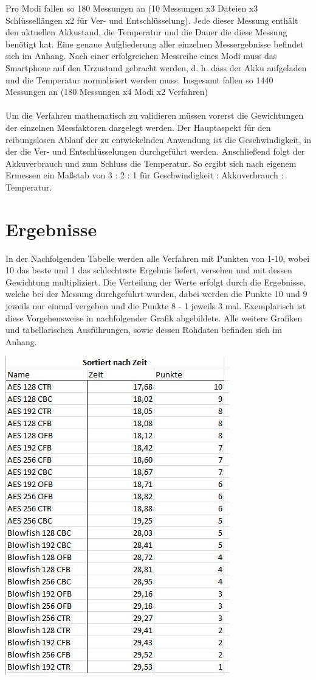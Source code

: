 \documentclass[10pt, a4paper,headsepline]{scrreprt}
\begin{document}
Pro Modi fallen so 180 Messungen an (10 Messungen x3 Dateien x3 Schlüssellängen x2 für Ver- und Entschlüsselung). Jede dieser Messung enthält den aktuellen Akkustand, die Temperatur und die Dauer die diese Messung benötigt hat. Eine genaue Aufgliederung aller einzelnen Messergebnisse befindet sich im Anhang. Nach einer erfolgreichen Messreihe eines Modi muss das Smartphone auf den Urzustand gebracht werden, d. h. dass der Akku aufgeladen und die Temperatur normalisiert werden muss. Insgesamt fallen so 1440 Messungen an (180 Messungen x4 Modi x2 Verfahren)\\ \\
Um die Verfahren mathematisch zu validieren müssen vorerst die Gewichtungen der einzelnen Messfaktoren dargelegt werden. Der Hauptaspekt für den reibungslosen Ablauf der zu entwickelnden Anwendung ist die Geschwindigkeit, in der die Ver- und Entschlüsselungen durchgeführt werden. Anschließend folgt der Akkuverbrauch und zum Schluss die Temperatur. So ergibt sich nach eigenem Ermessen ein Maßstab von 3 : 2 : 1 für Geschwindigkeit : Akkuverbrauch : Temperatur. 
\section{Ergebnisse}
In der Nachfolgenden Tabelle werden alle Verfahren mit Punkten von 1-10, wobei 10 das beste und 1 das schlechteste Ergebnis liefert, versehen und mit dessen Gewichtung multipliziert. Die Verteilung der Werte erfolgt durch die Ergebnisse, welche bei der Messung durchgeführt wurden, dabei werden die Punkte 10 und 9 jeweils nur einmal vergeben und die Punkte 8 - 1 jeweils 3 mal. Exemplarisch ist diese Vorgehensweise in nachfolgender Grafik abgebildete. Alle weitere Grafiken und tabellarischen Ausführungen, sowie dessen Rohdaten befinden sich im Anhang. 

\includegraphics[scale=0.9]{tabelle_zeitvergleich_punkte.JPG}
\hfill
\end{document}

